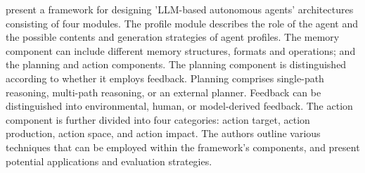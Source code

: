 \documentclass{article}
\begin{document}

\cite{wang_survey_2024} present a framework for designing 'LLM-based autonomous agents' architectures consisting of four modules. The profile module describes the role of the agent and the possible contents and generation strategies of agent profiles. The memory component can include different memory structures, formats and operations; and the planning and action components. The planning component is distinguished according to whether it employs feedback. Planning comprises single-path reasoning, multi-path reasoning, or an external planner. Feedback can be distinguished into environmental, human, or model-derived feedback. The action component is further divided into four categories: action target, action production, action space, and action impact. The authors outline various techniques that can be employed within the framework's components, and present potential applications and evaluation strategies. 
\end{document}
